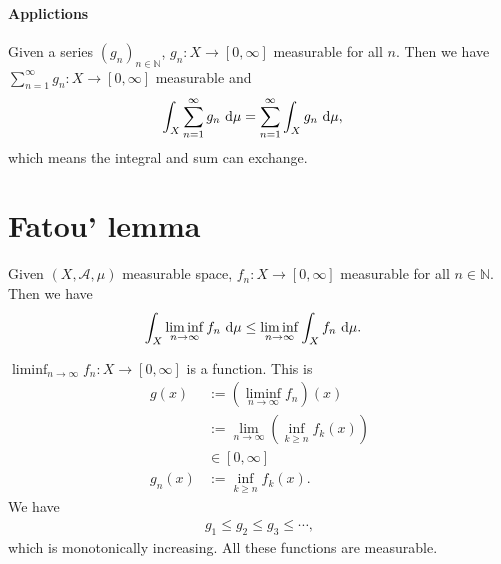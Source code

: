 \documentclass[../../note.tex]{subfiles}
\begin{document}
\paragraph{Applictions}
    Given a series $(g_n)_{n \in \mathbb{N}}$, $g_n: X \rightarrow [0,\infty]$ measurable for all $n$. Then we have $\sum_{n=1}^\infty g_n: X \rightarrow [0,\infty]$ measurable and 
    \begin{align}
        \int_X \sum_{n=1}^{\infty} g_n~{\rm d}\mu
        &= \sum_{n=1}^{\infty} \int_X g_n~{\rm d}\mu,
    \end{align}
    which means the integral and sum can exchange.

\section{Fatou' lemma}
\begin{lemma}
    \label{lemma: fatou' lemma}
    Given $(X, \mathcal{A}, \mu)$ measurable space, $f_n: X \rightarrow [0,\infty]$ measurable for all $n \in \mathbb{N}$. Then we have
    \begin{align}
        \int_X \liminf_{n \rightarrow \infty} f_n~{\rm d}\mu
        &\leq \liminf_{n \rightarrow \infty} \int_X f_n~{\rm d}\mu.
    \end{align}
\end{lemma}
\begin{remark}
    $\liminf_{n \rightarrow \infty} f_n: X \rightarrow [0,\infty]$ is a function. This is
    \begin{align}
        g(x)
        &:= \left(\liminf_{n \rightarrow \infty} f_n \right)(x) \\
        &:= \lim_{n \rightarrow \infty} \left(\inf_{k \geq n} f_k(x)\right) \\
        &\in [0,\infty] \\
        g_n(x)
        &:= \inf_{k \geq n} f_k(x).
    \end{align}
    We have 
    \begin{align}
        g_1 \leq g_2 \leq g_3 \leq \cdots ,
    \end{align}
    which is monotonically increasing. All these functions are measurable.
\end{remark}
\end{document}
